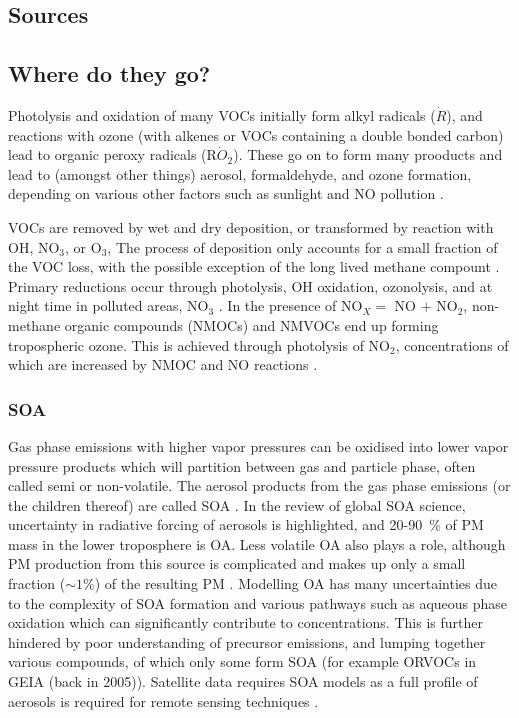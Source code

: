   \subsection{Sources}
  
  \subsection{Where do they go?}
    \label{LR:sec:VOCproducts}
    
    Photolysis and oxidation of many VOCs initially form alkyl radicals ($\dot{R}$), and reactions with ozone (with alkenes or VOCs containing a double bonded carbon) lead to organic peroxy radicals (R$\dot{O}_2$). 
    These go on to form many prooducts and lead to (amongst other things) aerosol, formaldehyde, and ozone formation, depending on various other factors such as sunlight and NO pollution \citep{Atkinson2000}.
    
    VOCs are removed by wet and dry deposition, or transformed by reaction with OH, NO$_3$, or O$_3$,
    The process of deposition only accounts for a small fraction of the VOC loss, with the possible exception of the long lived methane compount \citep{AtkinsonArey2003}.
    Primary reductions occur through photolysis, OH oxidation, ozonolysis, and at night time in polluted areas, NO$_3$ \citep{AtkinsonArey2003, Brown2009}.
    In the presence of NO$_X = $ NO $+$ NO$_2$, non-methane organic compounds (NMOCs) and NMVOCs end up forming tropospheric ozone.
    This is achieved through photolysis of NO$_2$, concentrations of which are increased by NMOC and NO reactions \citep{AtkinsonArey2003}.
    
    \subsubsection{SOA}
      \label{LR:sec:SOA}
      Gas phase emissions with higher vapor pressures can be oxidised into lower vapor pressure products which will partition between gas and particle phase, often called semi or non-volatile. 
  	  The aerosol products from the gas phase emissions (or the children thereof) are called SOA \citep{Kanakidou2005}.
      In the \cite{Kanakidou2005} review of global SOA science, uncertainty in radiative forcing of aerosols is highlighted, and 20-90~\% of PM mass in the lower troposphere is OA.
      Less volatile OA also plays a role, although PM production from this source is complicated and makes up only a small fraction ($\sim 1 \%$) of the resulting PM \citep{Kroll2008,Bei2012}.
      Modelling OA has many uncertainties due to the complexity of SOA formation and various pathways such as aqueous phase oxidation which can significantly contribute to concentrations.
      This is further hindered by poor understanding of precursor emissions, and lumping together various compounds, of which only some form SOA (for example ORVOCs in GEIA (back in 2005)).
      Satellite data requires SOA models as a full profile of aerosols is required for remote sensing techniques \citep{Kanakidou2005}.
      
